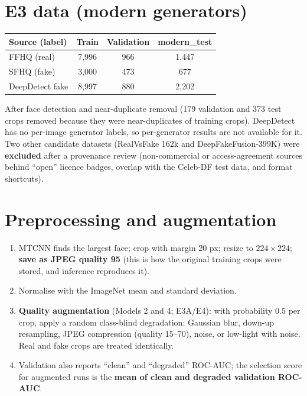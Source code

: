 \documentclass[11pt,a4paper]{report}
\begin{document}
\section{E3 data (modern generators)}
\begin{center}
\small
\begin{tabular}{|l|c|c|c|}
\hline
\textbf{Source (label)} & \textbf{Train} & \textbf{Validation} & \textbf{modern\_test}\\\hline
FFHQ (real) & 7,996 & 966 & 1,447\\\hline
SFHQ (fake) & 3,000 & 473 & 677\\\hline
DeepDetect fake & 8,997 & 880 & 2,202\\\hline
\end{tabular}
\end{center}
After face detection and near-duplicate removal (179 validation and 373 test crops removed because they were near-duplicates of training crops). DeepDetect has no per-image generator labels, so per-generator results are not available for it.
Two other candidate datasets (RealVsFake 162k and DeepFakeFusion-399K) were \textbf{excluded} after a provenance review (non-commercial or access-agreement sources behind ``open'' licence badges, overlap with the Celeb-DF test data, and format shortcuts).

\section{Preprocessing and augmentation}
\begin{enumerate}
\item MTCNN finds the largest face; crop with margin 20 px; resize to $224\times224$; \textbf{save as JPEG quality 95} (this is how the original training crops were stored, and inference reproduces it).
\item Normalise with the ImageNet mean and standard deviation.
\item \textbf{Quality augmentation} (Models 2 and 4; E3A/E4): with probability 0.5 per crop, apply a random class-blind degradation: Gaussian blur, down-up resampling, JPEG compression (quality 15--70), noise, or low-light with noise. Real and fake crops are treated identically.
\item Validation also reports ``clean'' and ``degraded'' ROC-AUC; the selection score for augmented runs is the \textbf{mean of clean and degraded validation ROC-AUC}.
\end{enumerate}
\end{document}
